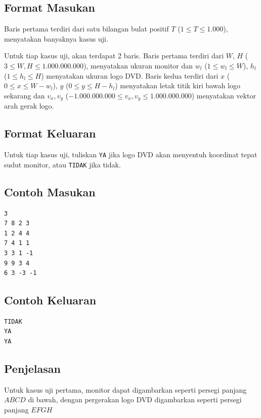 \documentclass{article}
\begin{document}
\subsection*{Format Masukan}

Baris pertama terdiri dari satu bilangan bulat positif $T$ ($1 \leq T \leq 1.000$), menyatakan banyaknya kasus uji.

Untuk tiap kasus uji, akan terdapat 2 baris.
Baris pertama terdiri dari $W$, $H$ ($3 \leq W, H \leq 1.000.000.000$), menyatakan ukuran monitor dan $w_l$ ($1 \leq w_l \leq W$), $h_l$ ($1 \leq h_l \leq H$) menyatakan ukuran logo DVD.
Baris kedua terdiri dari $x$ ($0 \leq x \leq W - w_l$), $y$ ($0 \leq y \leq H - h_l$) menyatakan letak titik kiri bawah logo sekarang dan $v_x, v_y$ ($-1.000.000.000 \leq v_x, v_y \leq 1.000.000.000$) menyatakan vektor arah gerak logo.

\subsection*{Format Keluaran}

Untuk tiap kasus uji, tuliskan \lstinline{YA} jika logo DVD akan menyentuh koordinat tepat sudut monitor, atau \lstinline{TIDAK} jika tidak.
\\

\begin{multicols}{2}
\subsection*{Contoh Masukan}
\begin{lstlisting}
3
7 8 2 3
1 2 4 4
7 4 1 1
3 3 1 -1
9 9 3 4
6 3 -3 -1
\end{lstlisting}
\columnbreak
\subsection*{Contoh Keluaran}
\begin{lstlisting}
TIDAK
YA
YA
\end{lstlisting}
\vfill
\null
\end{multicols}

\subsection*{Penjelasan}
Untuk kasus uji pertama, monitor dapat digambarkan seperti persegi panjang $ABCD$ di bawah, dengan pergerakan logo DVD digambarkan seperti persegi panjang $EFGH$
\end{document}
